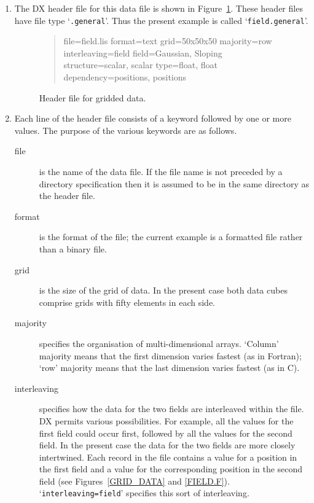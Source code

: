 \documentclass[twoside,11pt]{starlink}
\begin{document}
\begin{enumerate}

  \item The DX header file for this data file is shown in
   Figure~\ref{FIELD.GENERAL}. These header files have file type
   `\texttt{.general}'. Thus the present example is called `\texttt{field.general}'.

  \begin{figure}[htbp]

\begin{quote}
\begin{terminalv}
file=field.lis
format=text
grid=50x50x50
majority=row
interleaving=field
field=Gaussian, Sloping
structure=scalar, scalar
type=float, float
dependency=positions, positions
\end{terminalv}
\end{quote}

  \caption[Header file for gridded data.]{Header file for gridded data.
  \label{FIELD.GENERAL} }

  \end{figure}

  \item Each line of the header file consists of a keyword followed by
   one or more values. The purpose of the various keywords are as
   follows.

  \begin{description}

    \item[file] is the name of the data file. If the file name is not
     preceded by a directory specification then it is assumed to be in
     the same directory as the header file.

    \item[format] is the format of the file; the current example is
     a formatted file rather than a binary file.

    \item[grid] is the size of the grid of data. In the present case
     both data cubes comprise grids with fifty elements in each side.

    \item[majority] specifies the organisation of multi-dimensional
     arrays. `Column' majority means that the first dimension varies
     fastest (as in Fortran); `row' majority means that the last
     dimension varies fastest (as in C).

    \item[interleaving] specifies how the data for the two fields are
     interleaved within the file. DX permits various possibilities.
     For example, all the values for the first field could occur
     first, followed by all the values for the second field. In the
     present case the data for the two fields are more closely
     intertwined. Each record in the file contains a value for a
     position in the first field and a value for the corresponding
     position in the second field (see Figures~\ref{GRID_DATA} and
     \ref{FIELD.F}). `\texttt{interleaving=field}' specifies this
     sort of interleaving.


\end{description}
\end{enumerate}
\end{document}
